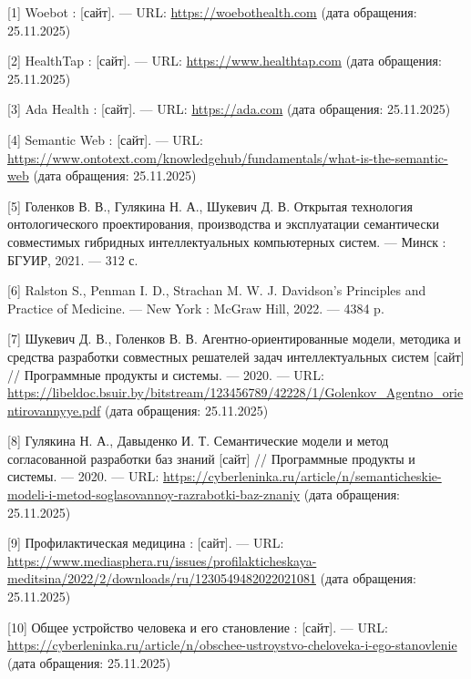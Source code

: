 \documentclass[a4paper,14pt,oneside,final]{report}
\begin{document}


%

%






%


[1] Woebot : [сайт]. — URL: \url{https://woebothealth.com} (дата обращения: 25.11.2025)

[2] HealthTap : [сайт]. — URL: \url{https://www.healthtap.com} (дата обращения: 25.11.2025)

[3] Ada Health : [сайт]. — URL: \url{https://ada.com} (дата обращения: 25.11.2025)

[4] Semantic Web : [сайт]. — URL: \url{https://www.ontotext.com/knowledgehub/fundamentals/what-is-the-semantic-web} (дата обращения: 25.11.2025)

[5] Голенков В. В., Гулякина Н. А., Шукевич Д. В.  
Открытая технология онтологического проектирования, производства и эксплуатации семантически совместимых гибридных интеллектуальных компьютерных систем. — Минск : БГУИР, 2021. — 312 с.

[6] Ralston S., Penman I. D., Strachan M. W. J.  
Davidson’s Principles and Practice of Medicine. — New York : McGraw Hill, 2022. — 4384 p.

[7] Шукевич Д. В., Голенков В. В.  
Агентно-ориентированные модели, методика и средства разработки совместных решателей задач интеллектуальных систем [сайт] // Программные продукты и системы. — 2020. — URL: \url{https://libeldoc.bsuir.by/bitstream/123456789/42228/1/Golenkov_Agentno_orientirovannyye.pdf} (дата обращения: 25.11.2025)

[8] Гулякина Н. А., Давыденко И. Т.  
Семантические модели и метод согласованной разработки баз знаний [сайт] // Программные продукты и системы. — 2020. — URL: \url{https://cyberleninka.ru/article/n/semanticheskie-modeli-i-metod-soglasovannoy-razrabotki-baz-znaniy} (дата обращения: 25.11.2025)

[9] Профилактическая медицина : [сайт]. — URL: \url{https://www.mediasphera.ru/issues/profilakticheskaya-meditsina/2022/2/downloads/ru/1230549482022021081} (дата обращения: 25.11.2025)

[10] Общее устройство человека и его становление : [сайт]. — URL: \url{https://cyberleninka.ru/article/n/obschee-ustroystvo-cheloveka-i-ego-stanovlenie} (дата обращения: 25.11.2025)



%
\end{document}

